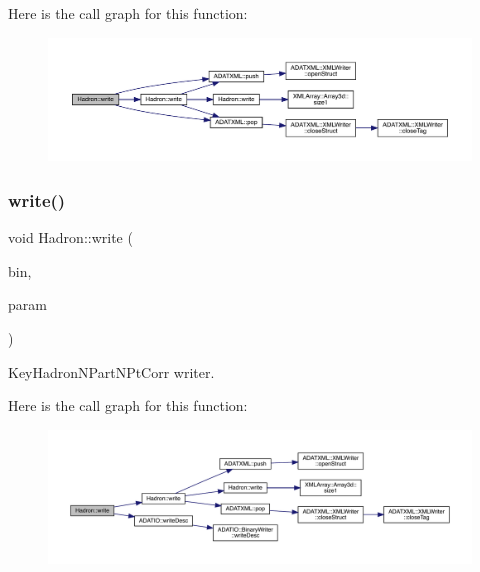 Here is the call graph for this function\+:
\nopagebreak
\begin{figure}[H]
\begin{center}
\leavevmode
\includegraphics[width=350pt]{d1/daf/namespaceHadron_ad194604b0eb61ca7e7ffa89d1ef4c879_cgraph}
\end{center}
\end{figure}
\mbox{\label{namespaceHadron_adfbaeaa21e67fb5560f0cf7bddc6ce70}} 
\subsubsection{\texorpdfstring{write()}{write()}\hspace{0.1cm}{\footnotesize\ttfamily [59/95]}}
{\footnotesize\ttfamily void Hadron\+::write (\begin{DoxyParamCaption}\item[{\mbox{\hyperlink{classADATIO_1_1BinaryWriter}{Binary\+Writer}} \&}]{bin,  }\item[{const \mbox{\hyperlink{structHadron_1_1KeyHadronNPartNPtCorr__t}{Key\+Hadron\+N\+Part\+N\+Pt\+Corr\+\_\+t}} \&}]{param }\end{DoxyParamCaption})}



Key\+Hadron\+N\+Part\+N\+Pt\+Corr writer. 

Here is the call graph for this function\+:
\nopagebreak
\begin{figure}[H]
\begin{center}
\leavevmode
\includegraphics[width=350pt]{d1/daf/namespaceHadron_adfbaeaa21e67fb5560f0cf7bddc6ce70_cgraph}
\end{center}
\end{figure}
\mbox{\label{namespaceHadron_a70fe8dc6184653dde216306a0f4681d9}} 
